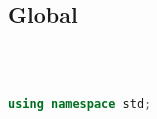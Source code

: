 \subsection{Global}
\begin{lstlisting}[language=C++]



using namespace std;






\end{lstlisting}
